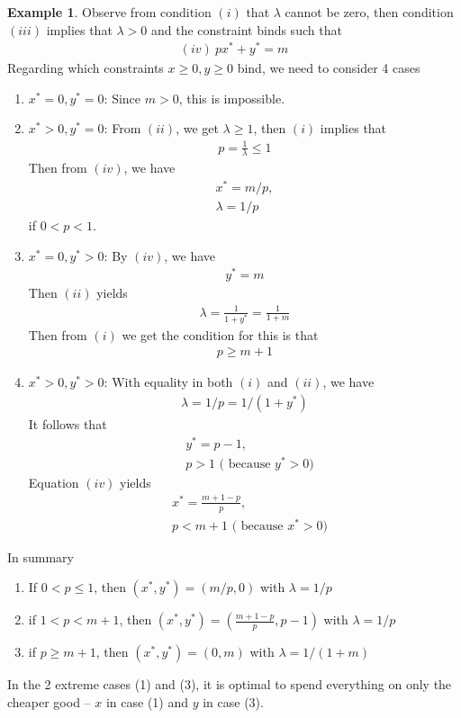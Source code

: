 \documentclass[10pt,a4paper]{book}
\theoremstyle{definition}\newtheorem{definition}{Definition}
\theoremstyle{definition}\newtheorem{fact}{Fact}
\theoremstyle{definition}\newtheorem{ex}{Ex.}
\theoremstyle{definition}\newtheorem{project}{Project}
\theoremstyle{definition}\newtheorem{problem}{Problem}
\theoremstyle{definition}\newtheorem{example}{Example}
\numberwithin{theorem}{chapter}
\numberwithin{corollary}{chapter}
\numberwithin{assumption}{chapter}
\numberwithin{definition}{chapter}
\numberwithin{prop}{chapter}
\numberwithin{notation}{chapter}
\numberwithin{problem}{chapter}
\numberwithin{example}{chapter}
\numberwithin{fact}{chapter}
\numberwithin{ex}{chapter}
\begin{document}
\begin{example}
		Observe from condition $(i)$ that $\lambda$ cannot be zero, then condition $(iii)$ implies that $\lambda > 0$ and the constraint binds such that
		\begin{align*}
			(iv) \  px^* + y^* = m
		\end{align*}
		Regarding which constraints $x\geq 0, y \geq 0$ bind, we need to consider 4 cases
		\begin{enumerate}
			\item $x^*=0, y^* = 0$: Since $m>0$, this is impossible.
			\item $x^* > 0, y^* = 0$: From $(ii)$, we get $\lambda \geq 1$, then $(i)$ implies that
			\begin{align*}
				p = \frac{1}{\lambda} \leq 1
			\end{align*}
			Then from $(iv)$, we have
			\begin{align*}
				x^* = m/p, \\
				\lambda = 1/p
			\end{align*}	
			if $0 < p < 1$.
			\item $x^* = 0, y^* > 0$: By $(iv)$, we have 
			\begin{align*}
				y^* = m
			\end{align*}
		Then $(ii)$ yields 
		\begin{align*}
			\lambda = \frac{1}{1+y^*} = \frac{1}{1+m}
		\end{align*}
		Then from $(i)$ we get the condition for this is that
		\begin{align*}
			p \geq m+1
		\end{align*}
			\item $x^* > 0, y^* > 0$: With equality in both $(i)$ and $(ii)$, we have
			\begin{align*}
				\lambda = 1/p = 1/(1+y^*)
			\end{align*}
		It follows that
		\begin{align*}
			&y^* = p - 1, \\
			&p > 1 \text{ ( because $y^* > 0$)}
		\end{align*}
		Equation $(iv)$ yields
		\begin{align*}
			&x^* = \frac{m+1-p}{p}, \\
			&p < m+1 \text{ ( because $x^* > 0$)}
		\end{align*}
		\end{enumerate}
		In summary
		\begin{enumerate}
			\item If $0<p \leq 1$, then $(x^*, y^*)  = (m/p, 0)$ with $\lambda = 1/p$ 
			\item if $1<p< m+1$, then $(x^*, y^*) = (\frac{m+1-p}{p}, p-1)$ with $\lambda = 1/p$ 
			\item if $p \geq m+1$, then $(x^*, y^*)  = (0, m)$ with $\lambda = 1/(1+m)$
		\end{enumerate}
		In the 2 extreme cases (1) and (3), it is optimal to spend everything on only the cheaper good -- $x$ in case (1) and $y$ in case (3).
	\end{example}
	
\end{document}
